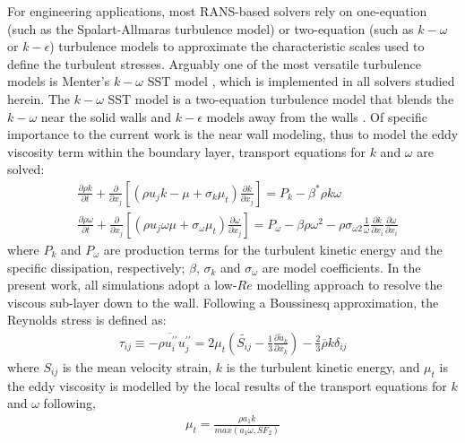\documentclass[journal ]{new-aiaa}
\begin{document}
For engineering applications, most RANS-based solvers rely on one-equation (such as the Spalart-Allmaras turbulence model) or two-equation (such as $k-\omega$ or $k-\epsilon$) turbulence models to approximate the characteristic scales used to define the turbulent stresses.  Arguably one of the most versatile turbulence models is Menter's $k-\omega$ SST model \cite{Menter1993}, which is implemented in all solvers studied herein. The $k-\omega$ SST model is a two-equation turbulence model that blends the $k - \omega$ near the solid walls and $k - \epsilon$ models  away from the walls \cite{wilcox2006turbulence}. Of specific importance to the current work is the near wall modeling, thus to model the eddy viscosity term within the boundary  layer, transport equations for $k$ and $\omega$ are solved:
\begin{align}
\label{eq:k-omega}
&\frac{\partial \rho k}{\partial t} + \frac{\partial}{\partial x_j } \left[ \left( \rho u_j k - \mu  + \sigma_k \mu _t \right){\frac{\partial k}{\partial x_j }} \right] = P_k - \beta^* \rho k \omega  \\
&\frac{\partial \rho \omega }{\partial t} + \frac{\partial}{\partial x_j }\left[ {\left( \rho u_j \omega {\mu  + \sigma_{\omega} \mu_t } \right){\frac{\partial \omega }{\partial x_j }}} \right] = P_\omega - \beta \rho \omega^2  - \rho \sigma_{\omega 2} \frac{1}{\omega} {\frac{\partial k }{\partial x_i}} {\frac{\partial \omega }{\partial x_i}} 
\end{align}
where $P_k$ and $P_{\omega}$ are production terms for the turbulent kinetic energy and the specific dissipation, respectively; $\beta$, $\sigma_k$ and $\sigma_{\omega}$ are model coefficients.  In the present work, all simulations adopt a low-$Re$ modelling approach to resolve the viscous sub-layer down to the wall. Following a Boussinesq approximation, the Reynolds stress is defined as:
\begin{align}
    \tau_{ij} \equiv \overline{- \rho u_i^{\prime\prime}u_j^{\prime\prime}} = 2 \mu_t \left(\tilde{S_{ij}} - \frac{1}{3} \frac{\partial \tilde{u}_k}{\partial x_k} \right) - \frac{2}{3} \overline{\rho} k \delta_{ij}
\end{align} 
where $S_{ij}$ is the mean velocity strain, $k$ is the turbulent kinetic energy, and $\mu_t$ is the eddy viscosity is modelled by the local results of the transport equations for $k$ and $\omega$ following,
\begin{align}
    \mu_{t} = \frac{\rho a_1 k}{max(a_1 \omega, S F_2)}
\end{align}
\end{document}
